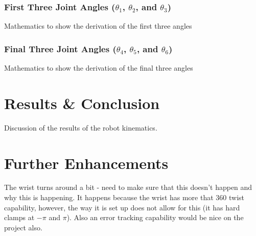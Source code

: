 \documentclass[a4paper]{article}
\begin{document}
\subsubsection{First Three Joint Angles ($\theta_1$, $\theta_2$, and $\theta_3$)}
Mathematics to show the derivation of the first three angles

\subsubsection{Final Three Joint Angles ($\theta_4$, $\theta_5$, and $\theta_6$)}
Mathematics to show the derivation of the final three angles

\section{Results \& Conclusion}
Discussion of the results of the robot kinematics.

\section{Further Enhancements}
The wrist turns around a bit - need to make sure that this doesn't happen and why this is happening. It happens because the wrist has more that 360 twist capability, however, the way it is set up does not allow for this (it has hard clamps at $-\pi$ and $\pi$). Also an error tracking capability would be nice on the project also.
\end{document}
